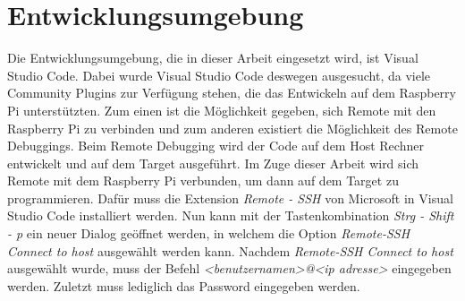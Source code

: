 \section{Entwicklungsumgebung}
\label{sec:entwicklungsumgebung}
Die Entwicklungsumgebung, die in dieser Arbeit eingesetzt wird, ist Visual Studio Code. Dabei
wurde Visual Studio Code deswegen ausgesucht, da viele Community Plugins zur Verfügung stehen,
die das Entwickeln auf dem Raspberry Pi unterstützten. Zum einen ist die Möglichkeit gegeben, sich
Remote mit den Raspberry Pi zu verbinden und zum anderen
existiert die Möglichkeit des Remote Debuggings. Beim Remote Debugging wird der Code auf dem
Host Rechner entwickelt und auf dem Target ausgeführt.
\newline
\newline
Im Zuge dieser Arbeit wird sich Remote mit dem Raspberry Pi verbunden, um dann auf dem Target zu
programmieren. Dafür muss die Extension \emph{Remote - SSH} von Microsoft in Visual Studio Code
installiert werden. Nun kann mit der Tastenkombination \emph{Strg - Shift - p} ein neuer Dialog
geöffnet werden, in welchem die Option \emph{Remote-SSH Connect to host} ausgewählt werden
kann. Nachdem \emph{Remote-SSH Connect to host} ausgewählt wurde, muss der Befehl
\emph{<benutzernamen>@<ip adresse>} eingegeben werden. Zuletzt muss lediglich das Password
eingegeben werden.
